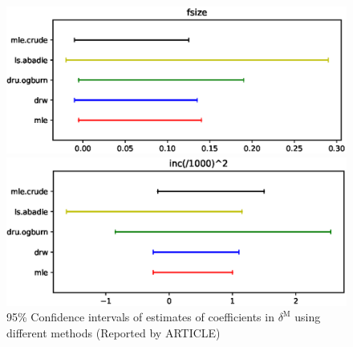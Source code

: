\documentclass{article}
\begin{document}
\begin{figure}
\begin{minipage}{0.48\linewidth}
\end{minipage}
\begin{minipage}{0.48\linewidth}
\includegraphics[width=\linewidth]{all4.eps}
\end{minipage}
\begin{minipage}{0.48\linewidth}
\includegraphics[width=\linewidth]{all5.eps}
\end{minipage}
\caption{95\% Confidence intervals of estimates of coefficients in $\delta^{\mathrm{M}}$ using different methods (Reported by ARTICLE)}
\end{figure}
\end{document}
